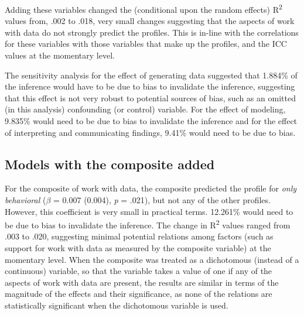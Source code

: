 \documentclass[]{msu-thesis}
\theoremstyle{definition}
\theoremstyle{definition}
\theoremstyle{definition}
\theoremstyle{remark}
\begin{document}
Adding these variables changed the (conditional upon the random effects)
R\textsuperscript{2} values from, .002 to .018, very small changes
suggesting that the aspects of work with data do not strongly predict
the profiles. This is in-line with the correlations for these variables
with those variables that make up the profiles, and the ICC values at
the momentary level.

The sensitivity analysis for the effect of generating data suggested
that 1.884\% of the inference would have to be due to bias to invalidate
the inference, suggesting that this effect is not very robust to
potential sources of bias, such as an omitted (in this analysis)
confounding (or control) variable. For the effect of modeling, 9.835\%
would need to be due to bias to invalidate the inference and for the
effect of interpreting and communicating findings, 9.41\% would need to
be due to bias.

\subsection{Models with the composite
added}\label{models-with-the-composite-added}

For the composite of work with data, the composite predicted the profile
for \emph{only behavioral} (\(\beta\) = 0.007 (0.004), \emph{p} = .021),
but not any of the other profiles. However, this coefficient is very
small in practical terms. 12.261\% would need to be due to bias to
invalidate the inference. The change in R\textsuperscript{2} values
ranged from .003 to .020, suggesting minimal potential relations among
factors (such as support for work with data as measured by the composite
variable) at the momentary level. When the composite was treated as a
dichotomous (instead of a continuous) variable, so that the variable
takes a value of one if any of the aspects of work with data are
present, the results are similar in terms of the magnitude of the
effects and their significance, as none of the relations are
statistically significant when the dichotomous variable is used.
\end{document}

